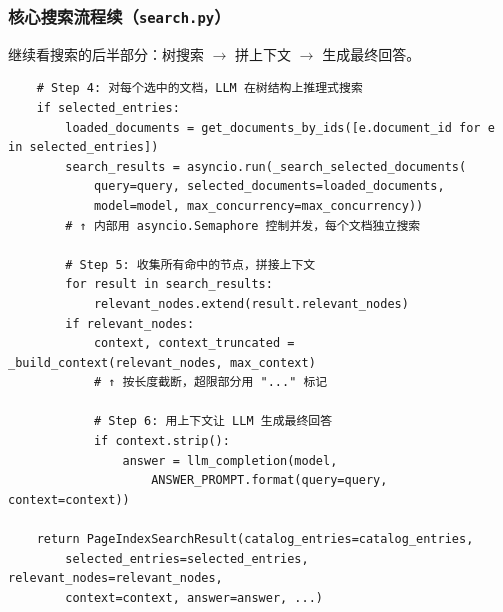 \documentclass[presentation,aspectratio=169,fontset=none]{ctexbeamer}
\begin{document}
\begin{frame}[fragile]
\frametitle{核心搜索流程续（\texttt{search.py}）}
{\scriptsize 继续看搜索的后半部分：树搜索 $\rightarrow$ 拼上下文 $\rightarrow$ 生成最终回答。}

\vspace{0.05cm}
{\tiny
\begin{verbatim}
    # Step 4: 对每个选中的文档，LLM 在树结构上推理式搜索
    if selected_entries:
        loaded_documents = get_documents_by_ids([e.document_id for e in selected_entries])
        search_results = asyncio.run(_search_selected_documents(
            query=query, selected_documents=loaded_documents,
            model=model, max_concurrency=max_concurrency))
        # ↑ 内部用 asyncio.Semaphore 控制并发，每个文档独立搜索

        # Step 5: 收集所有命中的节点，拼接上下文
        for result in search_results:
            relevant_nodes.extend(result.relevant_nodes)
        if relevant_nodes:
            context, context_truncated = _build_context(relevant_nodes, max_context)
            # ↑ 按长度截断，超限部分用 "..." 标记

            # Step 6: 用上下文让 LLM 生成最终回答
            if context.strip():
                answer = llm_completion(model,
                    ANSWER_PROMPT.format(query=query, context=context))

    return PageIndexSearchResult(catalog_entries=catalog_entries,
        selected_entries=selected_entries, relevant_nodes=relevant_nodes,
        context=context, answer=answer, ...)
\end{verbatim}}
\end{frame}

\end{document}
